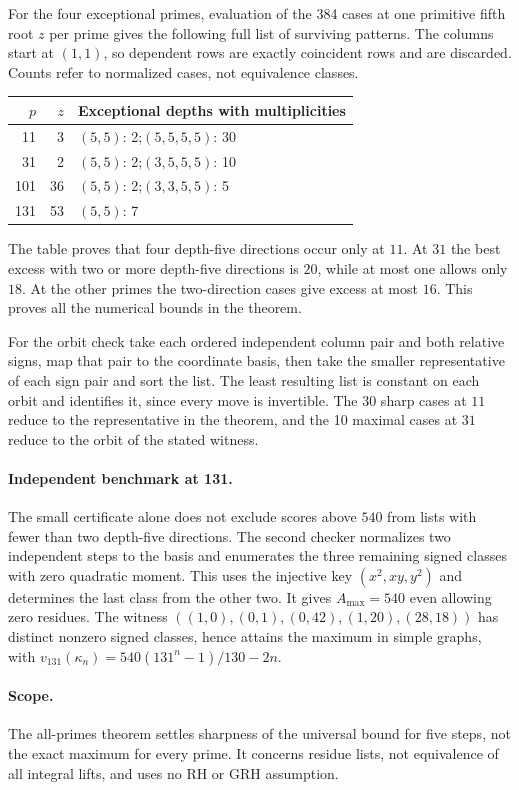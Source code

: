 \documentclass[11pt]{article}
\begin{document}
For the four exceptional primes, evaluation of the 384 cases at
one primitive fifth root $z$ per prime gives the following full
list of surviving patterns. The columns start at $(1,1)$, so
dependent rows are exactly coincident rows and are discarded.
Counts refer to normalized cases, not equivalence classes.
\begin{center}
\begin{tabular}{@{}rrl@{}}
\toprule
$p$ & $z$ & Exceptional depths with multiplicities\\
\midrule
11  & 3  & $(5,5)$: 2;\quad $(5,5,5,5)$: 30\\
31  & 2  & $(5,5)$: 2;\quad $(3,5,5,5)$: 10\\
101 & 36 & $(5,5)$: 2;\quad $(3,3,5,5)$: 5\\
131 & 53 & $(5,5)$: 7\\
\bottomrule
\end{tabular}
\end{center}
The table proves that four depth-five directions occur only at $11$.
At $31$ the best excess with two or more depth-five directions
is $20$, while at most one allows only $18$. At the other primes
the two-direction cases give excess at most $16$. This proves all
the numerical bounds in the theorem.

For the orbit check take each ordered independent column pair and
both relative signs, map that pair to the coordinate basis, then
take the smaller representative of each sign pair and sort the list.
The least resulting list is constant on each orbit and identifies it,
since every move is invertible. The 30 sharp cases at $11$ reduce
to the representative in the theorem, and the 10 maximal cases at
$31$ reduce to the orbit of the stated witness.

\paragraph{Independent benchmark at 131.}
The small certificate alone does not exclude scores above $540$
from lists with fewer than two depth-five directions. The second
checker normalizes two independent steps to the basis and enumerates
the three remaining signed classes with zero quadratic moment.
This uses the injective key $(x^2,xy,y^2)$ and determines the last
class from the other two. It gives $A_{\max}=540$ even allowing
zero residues. The witness
$((1,0),(0,1),(0,42),(1,20),(28,18))$ has distinct nonzero
signed classes, hence attains the maximum in simple graphs, with
$v_{131}(\kappa_n)=540(131^n-1)/130-2n$.

\paragraph{Scope.}
The all-primes theorem settles sharpness of the universal bound
for five steps, not the exact maximum for every prime. It concerns
residue lists, not equivalence of all integral lifts, and uses no RH
or GRH assumption.
\end{document}
